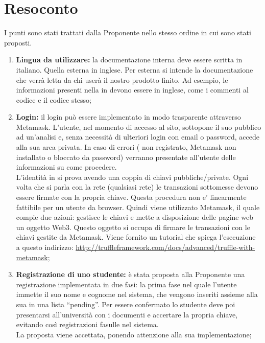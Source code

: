 \documentclass[VER-2017-11-22.tex]{subfiles}
\begin{document}
\chapter{Resoconto}
I punti sono stati trattati dalla Proponente nello stesso ordine in cui sono stati proposti.
\begin{enumerate}
	\item \textbf{Lingua da utilizzare:} la documentazione interna deve essere scritta in italiano. Quella esterna in inglese. Per esterna si intende la documentazione che verrà letta da chi userà il nostro prodotto finito. Ad esempio, le informazioni presenti nella  in  devono essere in inglese, come i commenti al codice e il codice stesso;
	\item \textbf{Login:} il login può essere implementato in modo trasparente attraverso Metamask. L’utente, nel momento di accesso al sito, sottopone il suo  pubblico ad un'analisi e, senza necessità di ulteriori login con email o password, accede alla sua area privata. In caso di errori ( non registrato, Metamask non installato o bloccato da password) verranno presentate all'utente delle informazioni su come procedere.\\	
	L'identità in  si prova avendo una coppia di chiavi pubbliche/private. Ogni volta che si parla con la rete  (qualsiasi rete) le transazioni sottomesse devono essere firmate con la propria chiave. Questa procedura non e' linearmente fattibile per un utente da browser. Quindi viene utilizzato Metamask, il quale compie due azioni: gestisce le chiavi e mette a disposizione delle pagine web un oggetto Web3. Questo oggetto si occupa di firmare le transazioni con le chiavi gestite da Metamask. Viene fornito un tutorial che spiega l'esecuzione a questo indirizzo: \href{http://truffleframework.com/docs/advanced/truffle-with-metamask}{http://truffleframework.com/docs/advanced/truffle-with-metamask};
	
	\item \textbf{Registrazione di uno studente:} è stata proposta alla Proponente una registrazione implementata in due fasi: la prima fase nel quale l’utente immette il suo nome e cognome nel sistema, che vengono inseriti assieme alla sua  in una lista “pending”. Per essere confermato lo studente deve poi presentarsi all’università con i documenti e accertare la propria chiave, evitando così registrazioni fasulle nel sistema.\\	
	La proposta viene accettata, ponendo attenzione alla sua implementazione;
	

\end{enumerate}
\end{document}
